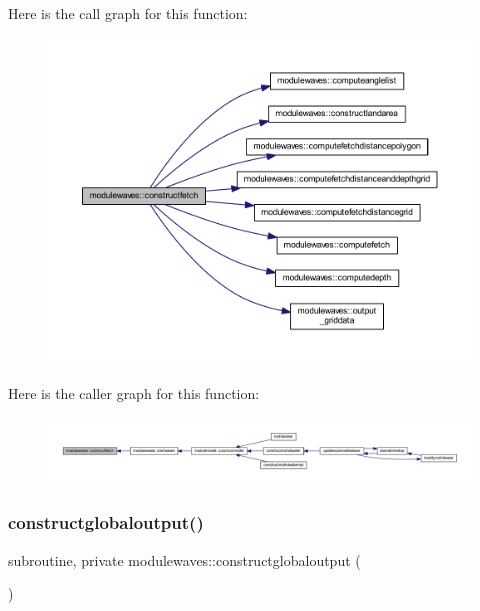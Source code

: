 Here is the call graph for this function\+:\nopagebreak
\begin{figure}[H]
\begin{center}
\leavevmode
\includegraphics[width=350pt]{namespacemodulewaves_ae74bdf3f12b1f411d55edf56bb284dc1_cgraph}
\end{center}
\end{figure}
Here is the caller graph for this function\+:\nopagebreak
\begin{figure}[H]
\begin{center}
\leavevmode
\includegraphics[width=350pt]{namespacemodulewaves_ae74bdf3f12b1f411d55edf56bb284dc1_icgraph}
\end{center}
\end{figure}
\mbox{\label{namespacemodulewaves_a069825270a300a70ba32518f571bcb90}} 
\subsubsection{\texorpdfstring{constructglobaloutput()}{constructglobaloutput()}}
{\footnotesize\ttfamily subroutine, private modulewaves\+::constructglobaloutput (\begin{DoxyParamCaption}{ }\end{DoxyParamCaption})\hspace{0.3cm}{\ttfamily [private]}}

